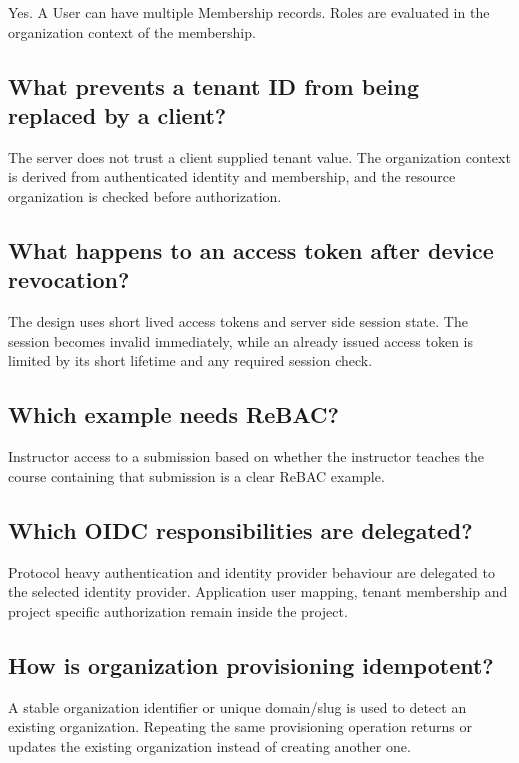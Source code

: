 \documentclass[11pt,a4paper]{article}
\begin{document}
Yes. A User can have multiple Membership records. Roles are evaluated in the organization context of the membership.

\subsection{What prevents a tenant ID from being replaced by a client?}

The server does not trust a client supplied tenant value. The organization context is derived from authenticated identity and membership, and the resource organization is checked before authorization.

\subsection{What happens to an access token after device revocation?}

The design uses short lived access tokens and server side session state. The session becomes invalid immediately, while an already issued access token is limited by its short lifetime and any required session check.

\subsection{Which example needs ReBAC?}

Instructor access to a submission based on whether the instructor teaches the course containing that submission is a clear ReBAC example.

\subsection{Which OIDC responsibilities are delegated?}

Protocol heavy authentication and identity provider behaviour are delegated to the selected identity provider. Application user mapping, tenant membership and project specific authorization remain inside the project.

\subsection{How is organization provisioning idempotent?}

A stable organization identifier or unique domain/slug is used to detect an existing organization. Repeating the same provisioning operation returns or updates the existing organization instead of creating another one.
\end{document}
